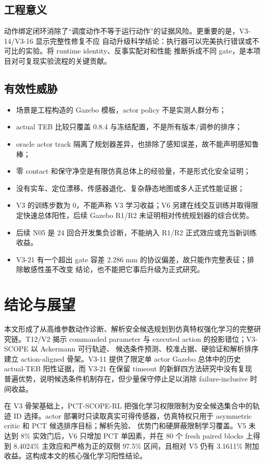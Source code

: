 \documentclass[12pt,a4paper,oneside]{report}
\begin{document}
\section{工程意义}
动作绑定闭环消除了“调度动作不等于运行动作”的证据风险。更重要的是，V3-14/V3-16 显示完整性修复不应
自动升级科学结论：执行器可以完美执行错误或不可比的实验。将 runtime identity、反事实配对和性能
推断拆成不同 gate，是本项目对可复现实验流程的关键贡献。

\section{有效性威胁}
\begin{itemize}
  \item 场景是工程构造的 Gazebo 模板，actor policy 不是实测人群分布；
  \item actual TEB 比较只覆盖 0.8.4 与冻结配置，不是所有版本/调参的排序；
  \item oracle actor track 隔离了规划器差异，也排除了感知误差，故不能声明感知鲁棒；
  \item 零 contact 和保守净空是有限仿真总体上的经验量，不是形式化安全证明；
  \item 没有实车、定位漂移、传感器退化、复杂静态地图或多人正式性能证据；
  \item V3 的训练步数为 0，不能声称 V3 学习收益；V6 另建在线交互训练并取得限定快速总体阳性，后续 Gazebo R1/R2 未证明相对传统规划器的综合优势。
  \item 后续 N05 是 24 回合开发集负诊断，不能纳入 R1/R2 正式效应或充当新训练收益。
  \item V3-21 有一个超出 gate 容差 2.286 mm 的协议偏差，故只能作完整表征；排除敏感性虽不改变
  结论，也不能把它事后升级为正式研究。
\end{itemize}

\chapter{结论与展望}
本文形成了从高维参数动作诊断、解析安全候选规划到仿真特权强化学习的完整研究链。T12/V2
揭示 commanded parameter 与 executed action 的投影错位；V3-SCOPE 以 Ackermann 可行轨迹、
候选条件预测、校准占据、硬验证和解析排序建立 action-aligned 骨架。V3-11 提供了限定单 actor
Gazebo 总体中的历史 actual-TEB 阳性证据，而 V3-21 在保留 timeout 的新鲜四方法研究中没有复现
普遍优势，说明候选条件机制存在，但少量保守停止足以消除 failure-inclusive 时间收益。

在 V3 骨架基础上，PCT-SCOPE-RL 把强化学习权限限制为安全候选集合中的轨迹 ID 选择。actor
部署时只读取真实可得传感器，仿真特权只用于 asymmetric critic 和 PCT 候选排序目标；解析先验、
优势门和硬屏蔽限制学习覆盖。V5 未达到 8\% 实效门后，V6 只增加 PCT 单因素，并在 80 个 fresh
paired blocks 上得到 8.4024\% 主效应和严格为正的双侧 97.5\% 区间，且相对 V5 仍有 3.1611\%
附加收益。这构成本文的核心强化学习阳性结论。
\end{document}
